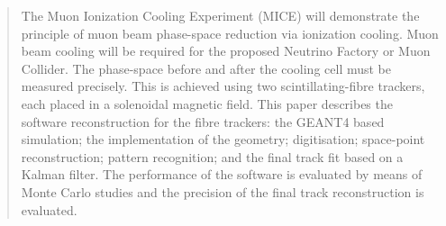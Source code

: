 \begin{quotation}

\noindent
The Muon Ionization Cooling Experiment (MICE) will demonstrate the principle of muon beam phase-space reduction via ionization cooling.  Muon beam cooling will be required for the proposed Neutrino Factory or Muon Collider.  The phase-space before and after the cooling cell must be measured precisely. This is achieved using two scintillating-fibre trackers, each placed in a solenoidal magnetic field.  This paper describes the software reconstruction for the fibre trackers: the GEANT4 based simulation; the implementation of the geometry; digitisation; space-point reconstruction; pattern recognition; and the final track fit based on a Kalman filter. The performance of the software is evaluated by means of Monte Carlo studies and the precision of the final track reconstruction is evaluated.

\end{quotation}
